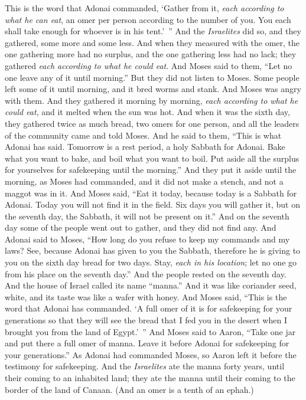 \begin{biblechapter}
\verse This is the word that Adonai commanded, ‘Gather from it, \textit{each according to what he can eat}, an omer per person according to the number of you. You each shall take enough for whoever is in his tent.’ ”
\verse And the \textit{Israelites} did so, and they gathered, some more and some less.
\verse And when they measured with the omer, the one gathering more had no surplus, and the one gathering less had no lack; they gathered \textit{each according to what he could eat}.
\verse And Moses said to them, “Let no one leave any of it until morning.”
\verse But they did not listen to Moses. Some people left some of it until morning, and it bred worms and stank. And Moses was angry with them.
\verse And they gathered it morning by morning, \textit{each according to what he could eat}, and it melted when the sun was hot.
\verse And when it was the sixth day, they gathered twice as much bread, two omers for one person, and all the leaders of the community came and told Moses.
\verse And he said to them, “This is what Adonai has said. Tomorrow is a rest period, a holy Sabbath for Adonai. Bake what you want to bake, and boil what you want to boil. Put aside all the surplus for yourselves for safekeeping until the morning.”
\verse And they put it aside until the morning, as Moses had commanded, and it did not make a stench, and not a maggot was in it.
\verse And Moses said, “Eat it today, because today is a Sabbath for Adonai. Today you will not find it in the field.
\verse Six days you will gather it, but on the seventh day, the Sabbath, it will not be present on it.”
\verse And on the seventh day some of the people went out to gather, and they did not find any.
\verse And Adonai said to Moses, “How long do you refuse to keep my commands and my laws?
\verse See, because Adonai has given to you the Sabbath, therefore he is giving to you on the sixth day bread for two days. Stay, \textit{each in his location}; let no one go from his place on the seventh day.”
\verse And the people rested on the seventh day.
\verse And the house of Israel called its name “manna.” And it was like coriander seed, white, and its taste was like a wafer with honey.
\verse And Moses said, “This is the word that Adonai has commanded. ‘A full omer of it is for safekeeping for your generations so that they will see the bread that I fed you in the desert when I brought you from the land of Egypt.’ ”
\verse And Moses said to Aaron, “Take one jar and put there a full omer of manna. Leave it before Adonai for safekeeping for your generations.”
\verse As Adonai had commanded Moses, so Aaron left it before the testimony for safekeeping.
\verse And the \textit{Israelites} ate the manna forty years, until their coming to an inhabited land; they ate the manna until their coming to the border of the land of Canaan.
\verse (And an omer is a tenth of an ephah.)
\end{biblechapter}

